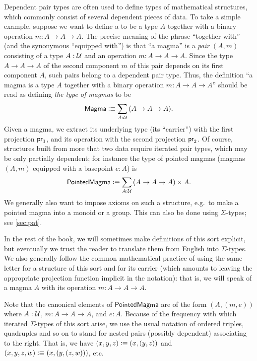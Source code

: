 Dependent pair types are often used to define types of mathematical structures, which commonly consist of several dependent pieces of data.
To take a simple example, suppose we want to define a  to be a type $A$ together with a binary operation $m:A\to A\to A$.
The precise meaning of the phrase ``together with'' (and the synonymous ``equipped with'') is that ``a magma'' is a \emph{pair} $(A,m)$ consisting of a type $A:\mathcal{U}$ and an operation $m:A\to A\to A$.
Since the type $A\to A\to A$ of the second component $m$ of this pair depends on its first component $A$, such pairs belong to a dependent pair type.
Thus, the definition ``a magma is a type $A$ together with a binary operation $m:A\to A\to A$'' should be read as defining \emph{the type of magmas} to be
\[ \mathsf{Magma} \defeq \sm{A:\UU} (A\to A\to A). \]
Given a magma, we extract its underlying type (its ``carrier'') with the first projection $\mathsf{pr}_{1}$, and its operation with the second projection $\mathsf{pr}_{2}$.
Of course, structures built from more that two data require iterated pair types, which may be only partially dependent; for instance the type of pointed magmas (magmas $(A,m)$ equipped with a basepoint $e:A$) is
\[ \mathsf{PointedMagma} \defeq \sm{A:\UU} (A\to A\to A) \times A. \]
We generally also want to impose axioms on such a structure, e.g.\ to make a pointed magma into a monoid or a group.
This can also be done using $\Sigma$-types; see \autoref{sec:pat}.

In the rest of the book, we will sometimes make definitions of this sort explicit, but eventually we trust the reader to translate them from English into $\Sigma$-types.
We also generally follow the common mathematical practice of using the same letter for a structure of this sort and for its carrier (which amounts to leaving the appropriate projection function implicit in the notation): that is, we will speak of a magma $A$ with its operation $m:A\to A\to A$.

Note that the canonical elements of $\mathsf{PointedMagma}$ are of the form $(A,(m,e))$ where $A:\mathcal{U}$, $m:A\to A\to A$, and $e:A$.
Because of the frequency with which iterated $\Sigma$-types of this sort arise, we use the usual notation of ordered triples, quadruples and so on to stand for nested pairs (possibly dependent) associating to the right.
That is, we have $(x,y,z) \vcentcolon\equiv (x,(y,z))$ and $(x,y,z,w)\vcentcolon\equiv (x,(y,(z,w)))$, etc.

%

